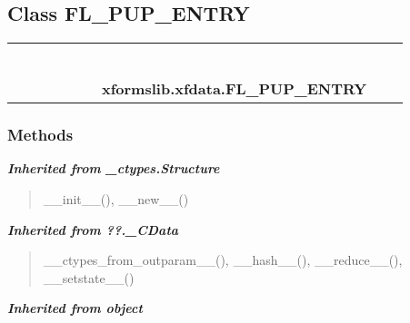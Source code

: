 \subsection{Class FL\_PUP\_ENTRY}

    \label{xformslib:xfdata:FL_PUP_ENTRY}
\begin{tabular}{cccccccccc}
\multicolumn{2}{r}{\settowidth{\BCL}{object}\multirow{2}{\BCL}{object}}
&&
&&
&&
  \\\cline{3-3}
  &&\multicolumn{1}{c|}{}
&&
&&
&&
  \\
\multicolumn{4}{r}{\settowidth{\BCL}{??.\_CData}\multirow{2}{\BCL}{??.\_CData}}
&&
&&
  \\\cline{5-5}
  &&&&\multicolumn{1}{c|}{}
&&
&&
  \\
\multicolumn{6}{r}{\settowidth{\BCL}{\_ctypes.Structure}\multirow{2}{\BCL}{\_ctypes.Structure}}
&&
  \\\cline{7-7}
  &&&&&&\multicolumn{1}{c|}{}
&&
  \\
&&&&&&\multicolumn{2}{l}{\textbf{xformslib.xfdata.FL\_PUP\_ENTRY}}
\end{tabular}



  \subsubsection{Methods}


\large{\textbf{\textit{Inherited from \_ctypes.Structure}}}

\begin{quote}
\_\_init\_\_(), \_\_new\_\_()
\end{quote}

\large{\textbf{\textit{Inherited from ??.\_CData}}}

\begin{quote}
\_\_ctypes\_from\_outparam\_\_(), \_\_hash\_\_(), \_\_reduce\_\_(), \_\_setstate\_\_()
\end{quote}

\large{\textbf{\textit{Inherited from object}}}

